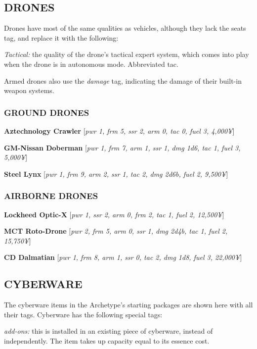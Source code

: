 \documentclass[oneside,10pt]{article}
\begin{document}
\begin{multicols}{2}
  \subsection{DRONES}
  Drones have most of the same qualities as vehicles, although they
  lack the seats tag, and replace it with the following:

  \begin{dent}
    \textit{Tactical:} the quality of the drone’s tactical expert
    system, which comes into play when the drone is in autonomous
    mode. Abbreviated tac.
  \end{dent}

  Armed drones also use the \textit{damage} tag, indicating the damage
  of their built-in weapon systems.

  \subsubsection{GROUND DRONES}
  \textbf{Aztechnology Crawler} [\textit{pwr 1, frm 5, ssr 2, arm 0,
    tac 0, fuel 3, 4,000¥}]

  \textbf{GM-Nissan Doberman} [\textit{pwr 1, frm 7, arm 1, ssr 1, dmg
    1d6, tac 1, fuel 3, 5,000¥}]

  \textbf{Steel Lynx} [\textit{pwr 1, frm 9, arm 2, ssr 1, tac 2, dmg
    2d6b, fuel 2, 9,500¥}]


  \subsubsection{AIRBORNE DRONES}
  \textbf{Lockheed Optic-X} [\textit{pwr 1, ssr 2, arm 0, frm 2, tac
    1, fuel 2, 12,500¥}]

  \textbf{MCT Roto-Drone} [\textit{pwr 2, frm 5, arm 0, ssr 1, dmg
    2d4b, tac 1, fuel 2, 15,750¥}]

  \textbf{CD Dalmatian} [\textit{pwr 1, frm 8, arm 1, ssr 0, tac 2,
    dmg 1d8, fuel 3, 22,000¥}]


  \subsection{CYBERWARE}
  The cyberware items in the Archetype’s starting packages are shown
  here with all their tags. Cyberware has the following special tags:
  \begin{dent}

    \textit{add-ons:} this is installed in an existing piece of
    cyberware, instead of independently. The item takes up capacity
    equal to its essence cost.


\end{dent}
\end{multicols}
\end{document}
